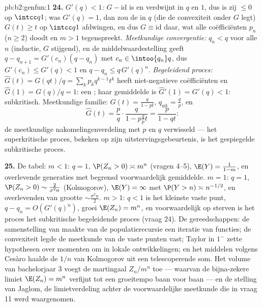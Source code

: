\begin{solution}{pb:b2:genfun:1}
\textbf{24.} \emph{$G'(q) < 1$:} $G - \mathrm{id}$ is  en
verdwijnt in $q$ en $1$, dus is zij $\leq 0$ op $\intcc q1$; was
$G'(q) = 1$, dan zou de  in $q$ (die de convexiteit onder
$G$ legt) $G(t) \geq t$ op $\intcc q1$ afdwingen, en dus $G \equiv
\mathrm{id}$ daar, wat alle coëfficiënten $p_n$ ($n \geq 2$) doodt
en $m > 1$ tegenspreekt. \emph{Meetkundige convergentie:} $q_n < q$
voor alle $n$ (inductie, $G$ stijgend), en de middelwaardestelling
geeft $q - q_{n+1} = G'(c_n)(q - q_n)$ met $c_n \in \intoo{q_n}q$,
dus $G'(c_n) \leq G'(q) < 1$ en $q - q_n \leq q\,G'(q)^n$.
\emph{Begeleidend proces:} $\widehat G(t) = G(qt)/q =
\sum_kp_kq^{k-1}t^k$ heeft niet-negatieve coëfficiënten en
$\widehat G(1) = G(q)/q = 1$: een ; haar
gemiddelde is $\widehat G'(1) = G'(q) < 1$: subkritisch.
Meetkundige familie: $G(t) = \frac{q}{1-pt}$,
$q_{\mathrm{uit}} = \frac qp$, en
\[
\widehat G(t) = \frac pq\cdot\frac{q}{1 - p\frac qp t}
= \frac{p}{1 - qt} :
\]
de meetkundige nakomelingenverdeling met $p$ en $q$ verwisseld ---
het superkritische proces, bekeken op zijn uitstervingsgebeurtenis,
is het gespiegelde subkritische proces.

\textbf{25.} De tabel: $m < 1$: $q = 1$, $\P(Z_n > 0) \asymp m^n$
(vragen 4--5), $\E(Y) = \frac1{1-m}$, en overlevende generaties met
begrensd voorwaardelijk gemiddelde. $m = 1$: $q = 1$, $\P(Z_n > 0)
\sim \frac2{\sigma^2n}$ (Kolmogorov), $\E(Y) = \infty$ met $\P(Y >
n) \asymp n^{-1/2}$, en overlevenden van grootte $\sim
\frac{\sigma^2n}2$. $m > 1$: $q < 1$ is het kleinste vaste punt, $q
- q_n = O(G'(q)^n)$, groei $\E(Z_n) = m^n$, en voorwaardelijk op
sterven is het proces het subkritische begeleidende proces (vraag
24). De gereedschappen: de samenstelling van 
maakte van de populatierecursie een iteratie van functies; de
convexiteit legde de meetkunde van de vaste punten vast; Taylor in
$1^-$ zette hypothesen over momenten om in lokale ontwikkelingen;
en het middelen volgens Cesàro haalde de $1/n$ van Kolmogorov uit
een telescoperende som. Het volume van bachelorjaar 3 voegt de
martingaal $Z_n/m^n$ toe --- waarvan de bijna-zekere limiet $\E(Z_n)
= m^n$ verfijnt tot een groeitempo baan voor baan --- en de
stelling van Jaglom, de limietverdeling achter de voorwaardelijke
meetkunde die in vraag 11 werd waargenomen.
\end{solution}
